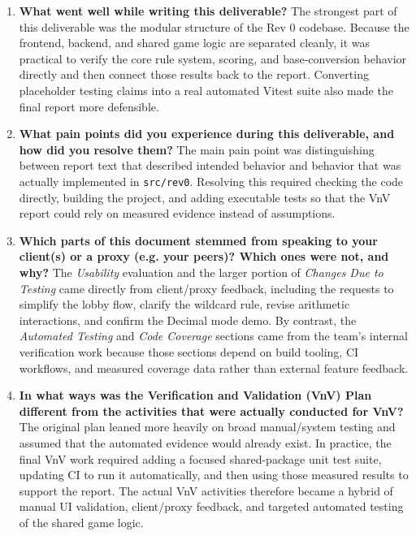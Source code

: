 \documentclass[12pt, titlepage]{article}
\begin{document}
    \begin{enumerate}
        \item \textbf{What went well while writing this deliverable?}
        The strongest part of this deliverable was the modular structure of the
        Rev 0 codebase. Because the frontend, backend, and shared game logic are
        separated cleanly, it was practical to verify the core rule system,
        scoring, and base-conversion behavior directly and then connect those
        results back to the report. Converting placeholder testing claims into a
        real automated Vitest suite also made the final report more defensible.

        \item \textbf{What pain points did you experience during this deliverable, and how did you resolve them?}
        The main pain point was distinguishing between report text that described
        intended behavior and behavior that was actually implemented in
        \texttt{src/rev0}. Resolving this required checking the code directly,
        building the project, and adding executable tests so that the VnV report
        could rely on measured evidence instead of assumptions.

        \item \textbf{Which parts of this document stemmed from speaking to your client(s) or a proxy (e.g. your peers)? Which ones were not, and why?}
        The \textit{Usability} evaluation and the larger portion of
        \textit{Changes Due to Testing} came directly from client/proxy feedback,
        including the requests to simplify the lobby flow, clarify the wildcard
        rule, revise arithmetic interactions, and confirm the Decimal mode demo.
        By contrast, the \textit{Automated Testing} and \textit{Code Coverage}
        sections came from the team's internal verification work because those
        sections depend on build tooling, CI workflows, and measured coverage
        data rather than external feature feedback.

        \item \textbf{In what ways was the Verification and Validation (VnV) Plan different from the activities that were actually conducted for VnV?}
        The original plan leaned more heavily on broad manual/system testing and
        assumed that the automated evidence would already exist. In practice, the
        final VnV work required adding a focused shared-package unit test suite,
        updating CI to run it automatically, and then using those measured
        results to support the report. The actual VnV activities therefore became
        a hybrid of manual UI validation, client/proxy feedback, and targeted
        automated testing of the shared game logic.
    \end{enumerate}
\end{document}
